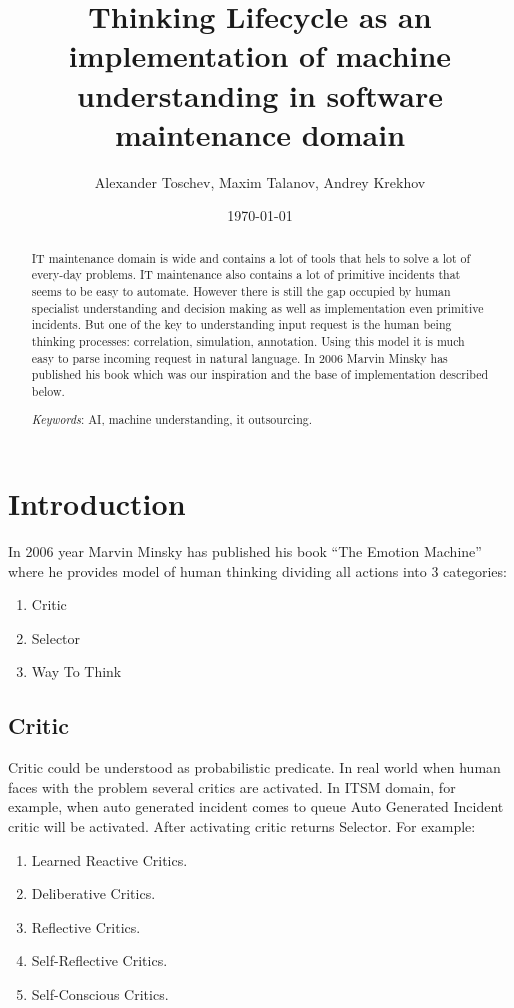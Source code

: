 \documentclass{llncs}
\title{Thinking Lifecycle as an implementation of machine understanding in software maintenance domain}
\author{Alexander Toschev\inst{1}, Maxim Talanov\inst{2}, Andrey Krekhov\inst{2}}
\institute{Kazan State University, Kazan, Russia
\and
Fujitsu GDC Russia, Kazan, Russia}
\date{\today}
\begin{document}
\maketitle

\begin{abstract}
IT maintenance domain is wide and contains a lot of tools that hels to solve a lot of every-day problems. IT maintenance also contains a lot of primitive incidents that seems to be easy to automate. However there is still the gap occupied by human specialist understanding and decision making as well as implementation even primitive incidents. But one of the key to understanding input request is the human being thinking processes: correlation, simulation, annotation. Using this model it is much easy to parse incoming request in natural language. In 2006 Marvin Minsky has published his book \cite{minsk} which was our inspiration and the base of implementation described below.

\emph{Keywords}: AI, machine understanding, it outsourcing.

\end{abstract}

\section{Introduction}
In 2006 year Marvin Minsky has published his book “The Emotion Machine” where he provides model of human thinking dividing all actions into 3 categories:

\begin{enumerate}
 \item Critic
 \item Selector
 \item Way To Think
\end{enumerate}

\subsection{Critic}
Critic could be understood as probabilistic predicate. In real world when human faces with the problem several critics are activated. In ITSM domain, for example, when auto generated incident comes to queue Auto Generated Incident critic will be activated. After activating critic returns Selector.
For example:

\begin{enumerate}
 \item Learned Reactive Critics.
 \item Deliberative Critics.
 \item Reflective Critics.
 \item Self-Reflective Critics.
 \item Self-Conscious Critics.
\end{enumerate}
\end{document}
